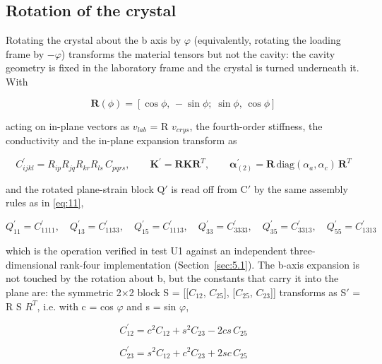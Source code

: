 \documentclass[preprint,12pt]{elsarticle}
\begin{document}
\subsection{Rotation of the crystal}
\label{sec:2.4}

Rotating the crystal about the b axis by $\varphi$ (equivalently, rotating the loading frame by $-\varphi$) transforms the material tensors but not the cavity: the cavity geometry is fixed in the laboratory frame and the crystal is turned underneath it. With

\begin{equation}
\mathbf{R}(\phi)=\left[\cos\phi,\,-\sin\phi;\;\sin\phi,\,\cos\phi\right] 
\label{eq:18}
\end{equation}

acting on in-plane vectors as $v_{lab}$ = R $v_{crys}$, the fourth-order stiffness, the conductivity and the in-plane expansion transform as

\begin{equation}
C^{\prime}_{ijkl}=R_{ip}R_{jq}R_{kr}R_{ls}\,C_{pqrs},\qquad \mathbf{K}^{\prime}=\mathbf{R}\mathbf{K}\mathbf{R}^{T},\qquad \boldsymbol{\alpha}^{\prime}_{(2)}=\mathbf{R}\,\mathrm{diag}(\alpha_a,\alpha_c)\,\mathbf{R}^{T} 
\label{eq:19}
\end{equation}

and the rotated plane-strain block Q$'$ is read off from C$'$ by the same assembly rules as in \eqref{eq:11},

\begin{equation}
Q^{\prime}_{11}=C^{\prime}_{1111},\quad Q^{\prime}_{13}=C^{\prime}_{1133},\quad Q^{\prime}_{15}=C^{\prime}_{1113},\quad Q^{\prime}_{33}=C^{\prime}_{3333},\quad Q^{\prime}_{35}=C^{\prime}_{3313},\quad Q^{\prime}_{55}=C^{\prime}_{1313} 
\label{eq:20}
\end{equation}

which is the operation verified in test U1 against an independent three-dimensional rank-four implementation (Section~\ref{sec:5.1}). The b-axis expansion is not touched by the rotation about b, but the constants that carry it into the plane are: the symmetric 2$\times$2 block S = [[$C_{12}$, $C_{25}$], [$C_{25}$, $C_{23}$]] transforms as S$'$ = R S $R^{T}$, i.e. with c = cos $\varphi$ and s = sin $\varphi$,

\begin{equation}
C^{\prime}_{12}=c^2C_{12}+s^2C_{23}-2cs\,C_{25} 
\label{eq:21}
\end{equation}

\begin{equation}
C^{\prime}_{23}=s^2C_{12}+c^2C_{23}+2sc\,C_{25} 
\label{eq:22}
\end{equation}
\end{document}
